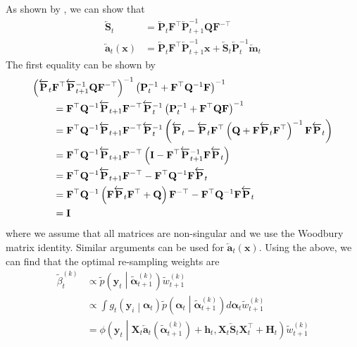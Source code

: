 \documentclass[notitlepage]{article}
\renewcommand{\vec}[1]{\bm{#1}}
\newcommand{\vecLarrow}[1]{\overleftarrow{\vec{#1}}}
\newcommand{\mat}[1]{\mathbf{#1}}
\newcommand{\matLarrow}[1]{\overleftarrow{\mat{#1}}}
\newcommand{\Lparen}[1]{\left( #1\right)}
\newcommand{\Cond}[2]{ #1 \middle\vert  #2}
\newcommand{\optor}[2]{#1\Lparen{#2}}
\newcommand{\optorC}[3]{\optor{#1}{\Cond{#2}{#3}}}
\newcommand{\pdenstC}[2]{\optorC{\widetilde p}{#1}{#2}}
\newcommand{\normaldC}[3]{\optorC{\phi}{#1}{#2,#3}}
\newcommand{\particB}[3]{\widetilde{#1}_{#2}^{\Lparen{#3}}}
\begin{document}
As shown by \cite{fearnhead10}, we can show that %
%
\begin{align}\label{eq:BWartCovar}
	\matLarrow{S}_t &= \matLarrow{P}_t\mat{F}^\top\matLarrow{P}_{t + 1}^{-1}\mat{Q}\mat{F}^{-\top} \\
%
	\vecLarrow{a}_t(\vec x) &=
		\matLarrow{P}_t\mat{F}^\top\matLarrow{P}_{t + 1}^{-1}\vec x
		+ \matLarrow{S}_t\matLarrow{P}_t^{-1} \vecLarrow{m}_t \nonumber
\end{align}%
%
The first equality can be shown by%
%
\begin{align*}
\Lparen{\matLarrow{P}_t\mat{F}^\top\matLarrow{P}_{t + 1}^{-1}
	\mat{Q}\mat{F}^{-\top}}^{-1}
	\Lparen{\mat P^{-1}_t + \mat F^\top\mat Q^{-1}\mat F}^{-1}
	\hspace{-175pt}& \\
&= \mat F^\top \mat Q^{-1}\matLarrow{P}_{t + 1}
	\mat F^{-\top}\matLarrow{P}_t^{-1}
	\Lparen{\mat P^{-1}_t + \mat F^\top\mat Q\mat F}^{-1} \\
&= \mat F^\top \mat Q^{-1}\matLarrow{P}_{t + 1}
	\mat F^{-\top}\matLarrow{P}_t^{-1}
	\Lparen{\matLarrow{P}_t - \matLarrow{P}_t
		\mat F^\top\Lparen{\mat Q + \mat F \matLarrow{P}_t 
			\mat F^\top}^{-1}
		\mat{F}\matLarrow{P}_t} \\
&= \mat F^\top \mat Q^{-1}\matLarrow{P}_{t + 1}
	\mat F^{-\top}
	\Lparen{\mat I -
		\mat F^\top\matLarrow{P}_{t + 1}^{-1}
		\mat{F}\matLarrow{P}_t} \\
&= \mat F^\top \mat Q^{-1}\matLarrow{P}_{t + 1}
	\mat F^{-\top} - \mat F^\top \mat Q^{-1} \mat F \matLarrow{P}_t \\
&= \mat F^\top \mat Q^{-1}\Lparen{
		\mat F \matLarrow{P}_t \mat F^\top + \mat Q}
	\mat F^{-\top} - \mat F^\top \mat Q^{-1} \mat F \matLarrow{P}_t \\
&= \mat I
\end{align*}
%
where we assume that all matrices are non-singular and we use the Woodbury matrix identity.
 Similar arguments can be used for $\vecLarrow{a}_t(\vec x)$. Using the above, we can 
 find that the optimal re-sampling weights are%
%
\begin{align}\label{eq:bwReWeight}
\particB{\beta}{t}{k} &\propto %
		\pdenstC{\vec{y}_t}{\particB{\vec\alpha}{t + 1}k}
		\particB w{t + 1}k \\
&\propto \int \nonumber
	\optorC{g_t}{\vec y_i}{\vec\alpha_t}
	\pdenstC{\vec\alpha_t}{\particB{\vec\alpha}{t + 1}k}
	d\vec\alpha_t \particB w{t + 1}k \\
	&=\normaldC{\vec y_t }{
		\mat X_t \vecLarrow{a}_t(
		\particB{\vec\alpha}{t + 1}k) + \vec h_t}{%
	\mat X_t\matLarrow{S}_t\mat X_t^\top + \mat H_t}
	\particB w{t + 1}k\nonumber
\end{align}%
\end{document}
